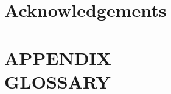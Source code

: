 \documentclass[lscape]{msu-thesis}
\begin{document}
\chapter*{Acknowledgements}
\DoubleSpacing %

\clearpage
\SingleSpacing
\tableofcontents* %
\clearpage
\listoftables %
\clearpage
\listoffigures %
%
%
\mainmatter
%







%
%
%
%
%
%
\clearpage
\appendix
\chapter*{APPENDIX\protect\\\vspace{.5cm}GLOSSARY}

%
\backmatter
%
%
\makebibliographycover %
%
\SingleSpacing


\end{document}
